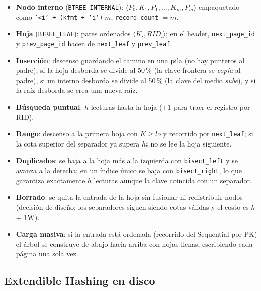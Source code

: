 \documentclass[11pt,a4paper]{article}
\newcommand{\code}[1]{\texttt{#1}}
\begin{document}
\begin{itemize}
\item \textbf{Nodo interno} (\code{BTREE\_INTERNAL}): $\langle P_0, K_1, P_1, \dots, K_m, P_m\rangle$
  empaquetado como \code{'<i' + (kfmt + 'i')$\cdot m$}; \code{record\_count} $=m$.
\item \textbf{Hoja} (\code{BTREE\_LEAF}): pares ordenados $\langle K_i, RID_i\rangle$; en el header,
  \code{next\_page\_id} y \code{prev\_page\_id} hacen de \code{next\_leaf} y \code{prev\_leaf}.
\item \textbf{Inserción}: descenso guardando el camino en una pila (no hay punteros al padre); si la
  hoja desborda se divide al 50\,\% (la clave frontera se \emph{copia} al padre), si un interno desborda
  se divide al 50\,\% (la clave del medio \emph{sube}), y si la raíz desborda se crea una nueva raíz.
\item \textbf{Búsqueda puntual}: $h$ lecturas hasta la hoja ($+1$ para traer el registro por RID).
\item \textbf{Rango}: descenso a la primera hoja con $K \ge lo$ y recorrido por \code{next\_leaf}; si
  la cota superior del separador ya supera $hi$ no se lee la hoja siguiente.
\item \textbf{Duplicados}: se baja a la hoja más a la izquierda con \code{bisect\_left} y se avanza a
  la derecha; en un índice único se baja con \code{bisect\_right}, lo que garantiza exactamente $h$
  lecturas aunque la clave coincida con un separador.
\item \textbf{Borrado}: se quita la entrada de la hoja sin fusionar ni redistribuir nodos (decisión
  de diseño: los separadores siguen siendo cotas válidas y el costo es $h$ + 1W).
\item \textbf{Carga masiva}: si la entrada está ordenada (recorrido del Sequential por PK) el árbol se
  construye de abajo hacia arriba con hojas llenas, escribiendo cada página una sola vez.
\end{itemize}

\subsection{Extendible Hashing en disco}
\end{document}
